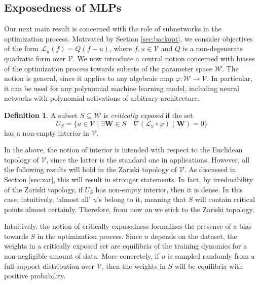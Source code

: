 \documentclass{article} %
\theoremstyle{plain}%
\theoremstyle{definition}
\newtheorem{defn}{Definition}
\theoremstyle{remark}
\begin{document}
 \subsection{Exposedness of MLPs}\label{sec:exp}
Our next main result is concerned with the role of subnetworks in the optimization process. Motivated by Section \ref{sec:backopt}, we consider objectives of the form $\mathcal{L}_u(f) = Q(f - u )$, where $f,u \in \mathcal{V}$ and $Q$ is a non-degenerate quadratic form over $\mathcal{V}$. We now introduce a central notion concerned with biases of the optimization process towards subsets of the parameter space $\mathcal{W}$. The notion is general, since it applies to any algebraic map $\varphi \colon \mathcal{W} \rightarrow \mathcal{V}$. In particular, it can be used for any polynomial machine learning model, including neural networks with polynomial activations of arbitrary architecture.   
\begin{defn}\label{defn:exposed}
    A subset $S \subseteq \mathcal{W} $ is \emph{critically exposed} if the set 
    \begin{equation}
        U_S = \{ u\in \mathcal{V} \mid \exists \mathbf{W} \in S  \quad  \nabla (\mathcal{L}_u \circ \varphi)(\mathbf{W}) = 0   \}         
    \end{equation}
    has a non-empty interior in $\mathcal{V}$.  
\end{defn}
In the above, the notion of interior is intended with respect to the Euclidean topology of $\mathcal{V}$, since the latter is the standard one in applications. However, all the following results will hold in the Zariski topology of $\mathcal{V}$. As discussed in Section \ref{sec:zar}, this will result in stronger statements. In fact, by irreducibility of the Zariski topology, if $U_S$ has non-empty interior, then it is dense. In this case, intuitively, `almost all' $u$'s belong to it, meaning that $S$ will contain critical points almost certainly. Therefore, from now on we stick to the Zariski topology. 


Intuitively, the notion of critically exposedness formalizes the presence of a bias towards $S$ in the optimization process. Since $u$ depends on the dataset, the weights in a critically exposed set are equilibria of the training dynamics for a non-negligible amount of data. More concretely, if $u$ is sampled randomly from a full-support distribution over $\mathcal{V}$, then the weights in $S$ will be equilibria with positive probability. 
\end{document}
